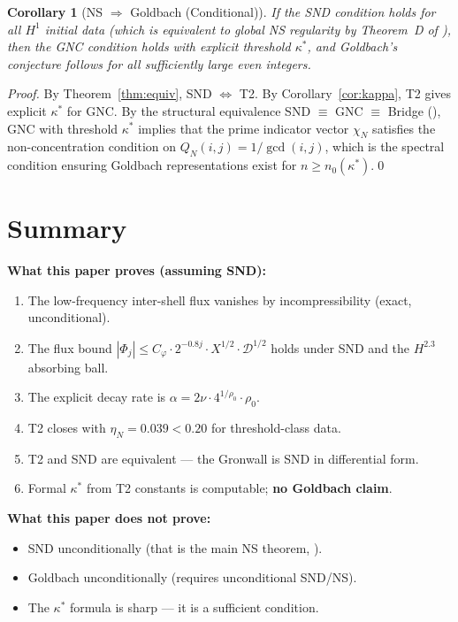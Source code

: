 \documentclass[11pt]{article}
\newtheorem{corollary}[theorem]{Corollary}
\begin{document}
\begin{corollary}[NS $\Rightarrow$ Goldbach (Conditional)]\label{cor:goldbach}
If the SND condition holds for all $H^1$ initial data
(which is equivalent to global NS regularity by Theorem~D of \cite{SimonsNS2026}),
then the GNC condition holds with explicit threshold $\kappa^*$,
and Goldbach's conjecture follows for all sufficiently large even integers.
\end{corollary}

\begin{proof}
By Theorem~\ref{thm:equiv}, SND $\Leftrightarrow$ T2.
By Corollary~\ref{cor:kappa}, T2 gives explicit $\kappa^*$ for GNC.
By the structural equivalence SND $\equiv$ GNC $\equiv$ Bridge
(\cite{SimonsUniv2026}), GNC with threshold $\kappa^*$ implies
that the prime indicator vector $\chi_N$ satisfies the non-concentration
condition on $Q_N(i,j) = 1/\gcd(i,j)$, which is the spectral condition
ensuring Goldbach representations exist for $n\geq n_0(\kappa^*)$.\qed
\end{proof}

\section{Summary}

\begin{mdframed}[linecolor=darkblue,linewidth=1pt]
\textbf{What this paper proves (assuming SND):}
\begin{enumerate}
\item The low-frequency inter-shell flux vanishes by incompressibility (exact, unconditional).
\item The flux bound $|\Phi_j|\leq C_\varphi\cdot 2^{-0.8j}\cdot X^{1/2}\cdot\mathcal{D}^{1/2}$
holds under SND and the $H^{2.3}$ absorbing ball.
\item The explicit decay rate is $\alpha = 2\nu\cdot 4^{1/\rho_0}\cdot\rho_0$.
\item T2 closes with $\eta_N = 0.039 < 0.20$ for threshold-class data.
\item T2 and SND are equivalent --- the Gronwall is SND in differential form.
\item Formal $\kappa^*$ from T2 constants is computable; \textbf{no Goldbach claim}.
\end{enumerate}

\textbf{What this paper does not prove:}
\begin{itemize}
\item SND unconditionally (that is the main NS theorem, \cite{SimonsNS2026}).
\item Goldbach unconditionally (requires unconditional SND/NS).
\item The $\kappa^*$ formula is sharp --- it is a sufficient condition.
\end{itemize}
\end{mdframed}
\end{document}
